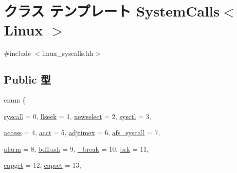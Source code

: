 \hypertarget{classSystemCalls_3_01Linux_01_4}{
\section{クラス テンプレート SystemCalls$<$ Linux $>$}
\label{classSystemCalls_3_01Linux_01_4}
}


{\ttfamily \#include $<$linux\_\-syscalls.hh$>$}\subsection*{Public 型}
\begin{DoxyCompactItemize}
\item 
enum \{ \par
\hyperlink{classSystemCalls_3_01Linux_01_4_aeb8e1c282570d629a6b603a94a4650d6aa4cde276fabc8006d7c18ae314f1d1eb}{syscall} =  0, 
\hyperlink{classSystemCalls_3_01Linux_01_4_aeb8e1c282570d629a6b603a94a4650d6af95792d4b936e096ca4dbc137d807d4a}{llseek} =  1, 
\hyperlink{classSystemCalls_3_01Linux_01_4_aeb8e1c282570d629a6b603a94a4650d6ac4e101d96e3b2c563f071962586a564c}{newselect} =  2, 
\hyperlink{classSystemCalls_3_01Linux_01_4_aeb8e1c282570d629a6b603a94a4650d6aa913686e4ff779ef4f86e3a3005dd37f}{sysctl} =  3, 
\par
\hyperlink{classSystemCalls_3_01Linux_01_4_aeb8e1c282570d629a6b603a94a4650d6ab522b9c4bb463e4c5d3f1c8e0dd7bca0}{access} =  4, 
\hyperlink{classSystemCalls_3_01Linux_01_4_aeb8e1c282570d629a6b603a94a4650d6a83d569627a7bb75edbdad824cbe0cc2e}{acct} =  5, 
\hyperlink{classSystemCalls_3_01Linux_01_4_aeb8e1c282570d629a6b603a94a4650d6ad8ef801511ecc96dc0506f6d23f42eeb}{adjtimex} =  6, 
\hyperlink{classSystemCalls_3_01Linux_01_4_aeb8e1c282570d629a6b603a94a4650d6a84594db9cb153fcb75b0b3c98ebdf37d}{afs\_\-syscall} =  7, 
\par
\hyperlink{classSystemCalls_3_01Linux_01_4_aeb8e1c282570d629a6b603a94a4650d6ac456c55fe37a0e93478bb2aa4cef0284}{alarm} =  8, 
\hyperlink{classSystemCalls_3_01Linux_01_4_aeb8e1c282570d629a6b603a94a4650d6a8e749feb0614736620b5f61915cccc1e}{bdflush} =  9, 
\hyperlink{classSystemCalls_3_01Linux_01_4_aeb8e1c282570d629a6b603a94a4650d6a3df19cdf10df64c9b49421dcb07eec16}{\_\-break} =  10, 
\hyperlink{classSystemCalls_3_01Linux_01_4_aeb8e1c282570d629a6b603a94a4650d6a1a4fde2958a6f8d5f3e9193d15b485d4}{brk} =  11, 
\par
\hyperlink{classSystemCalls_3_01Linux_01_4_aeb8e1c282570d629a6b603a94a4650d6a9e849ca19e2e92bd37db9e965a801bd8}{capget} =  12, 
\hyperlink{classSystemCalls_3_01Linux_01_4_aeb8e1c282570d629a6b603a94a4650d6a0f74bc96289a761b508c868437aba10d}{capset} =  13, 

\end{DoxyCompactItemize}
